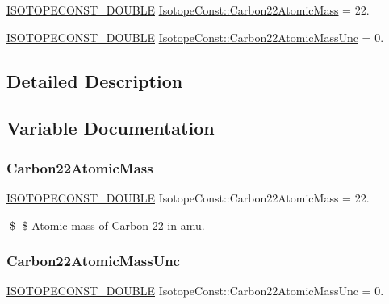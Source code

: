 \begin{DoxyCompactItemize}
\item 
\mbox{\hyperlink{group___isotope_const-_macros_ga8f45a7272ce02c0b4c65c44636ed719a}{I\+S\+O\+T\+O\+P\+E\+C\+O\+N\+S\+T\+\_\+\+D\+O\+U\+B\+LE}} \mbox{\hyperlink{group___isotope_const-_carbon-_c22_ga8a182e60e7498a07f3a63d968bfcb08d}{Isotope\+Const\+::\+Carbon22\+Atomic\+Mass}} = 22.
\item 
\mbox{\hyperlink{group___isotope_const-_macros_ga8f45a7272ce02c0b4c65c44636ed719a}{I\+S\+O\+T\+O\+P\+E\+C\+O\+N\+S\+T\+\_\+\+D\+O\+U\+B\+LE}} \mbox{\hyperlink{group___isotope_const-_carbon-_c22_gac010c9c7916782c2b157ccff162c8610}{Isotope\+Const\+::\+Carbon22\+Atomic\+Mass\+Unc}} = 0.
\end{DoxyCompactItemize}


\subsection{Detailed Description}


\subsection{Variable Documentation}
\mbox{\label{group___isotope_const-_carbon-_c22_ga8a182e60e7498a07f3a63d968bfcb08d}} 
\subsubsection{\texorpdfstring{Carbon22\+Atomic\+Mass}{Carbon22AtomicMass}}
{\footnotesize\ttfamily \mbox{\hyperlink{group___isotope_const-_macros_ga8f45a7272ce02c0b4c65c44636ed719a}{I\+S\+O\+T\+O\+P\+E\+C\+O\+N\+S\+T\+\_\+\+D\+O\+U\+B\+LE}} Isotope\+Const\+::\+Carbon22\+Atomic\+Mass = 22.}

\$ \$ Atomic mass of Carbon-\/22 in amu. \mbox{\label{group___isotope_const-_carbon-_c22_gac010c9c7916782c2b157ccff162c8610}} 
\subsubsection{\texorpdfstring{Carbon22\+Atomic\+Mass\+Unc}{Carbon22AtomicMassUnc}}
{\footnotesize\ttfamily \mbox{\hyperlink{group___isotope_const-_macros_ga8f45a7272ce02c0b4c65c44636ed719a}{I\+S\+O\+T\+O\+P\+E\+C\+O\+N\+S\+T\+\_\+\+D\+O\+U\+B\+LE}} Isotope\+Const\+::\+Carbon22\+Atomic\+Mass\+Unc = 0.}

